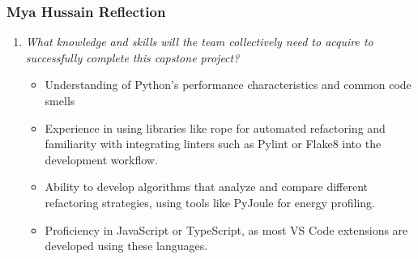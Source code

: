 \documentclass[12pt]{article}
\begin{document}
\subsubsection*{Mya Hussain Reflection}
\begin{enumerate}
  \item \textit{What knowledge and skills will the team collectively need to acquire to
  successfully complete this capstone project?}

    \begin{itemize}
      \item Understanding of Python's performance characteristics and common code smells
      \item Experience in using libraries like rope for automated refactoring and familiarity with integrating linters such as Pylint or Flake8 into the development workflow.
      \item Ability to develop algorithms that analyze and compare different refactoring strategies, using tools like PyJoule for energy profiling.
      \item  Proficiency in JavaScript or TypeScript, as most VS Code extensions are developed using these languages.
    \end{itemize}
 
\end{enumerate}
\end{document}
